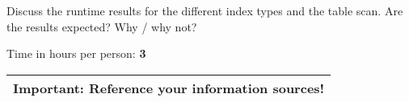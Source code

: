 \documentclass[11pt]{scrartcl}
\begin{document}
\medskip

Discuss the runtime results for the different index types and the
table scan. Are the results expected? Why / why not?\\


\bigskip

\noindent Time in hours per person: {\bf 3}

\bigskip

\begin{center}
  \begin{tabular}{c}
    \hline
    {\bf Important:} Reference your information sources!
    \\\hline
  \end{tabular}
\end{center}
\end{document}
